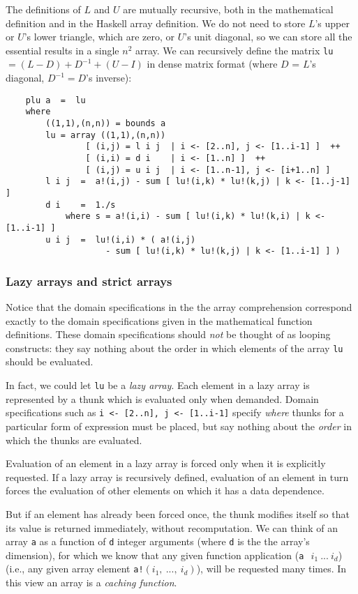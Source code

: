     The definitions of $L$ and $U$ are mutually recursive, both
in the mathematical definition and in the Haskell array definition.
We do not need to store $L$'s upper or $U$'s lower triangle, which
are zero, or $U$'s unit diagonal, so we can store all the essential
results in a single $n^2$ array.
We can recursively define the matrix {\tt lu}  $= (L-D) + D^{-1} + (U-I)$
in dense matrix format (where $D$ = $L$'s diagonal,
$D^{-1} = D$'s inverse):
\begin{verbatim}
    plu a  =  lu
    where
        ((1,1),(n,n)) = bounds a
        lu = array ((1,1),(n,n))
                [ (i,j) = l i j  | i <- [2..n], j <- [1..i-1] ]  ++
                [ (i,i) = d i    | i <- [1..n] ]  ++
                [ (i,j) = u i j  | i <- [1..n-1], j <- [i+1..n] ]
        l i j  =  a!(i,j) - sum [ lu!(i,k) * lu!(k,j) | k <- [1..j-1] ]
        d i    =  1./s
            where s = a!(i,i) - sum [ lu!(i,k) * lu!(k,i) | k <- [1..i-1] ]
        u i j  =  lu!(i,i) * ( a!(i,j)
                    - sum [ lu!(i,k) * lu!(k,j) | k <- [1..i-1] ] )
\end{verbatim}


\subsubsection {Lazy arrays and strict arrays}

Notice that the domain specifications in the the array comprehension
correspond exactly to the domain specifications given in the mathematical
function definitions.  These domain specifications should {\em not} be
thought of as looping constructs: they say nothing about the order in
which elements of the array {\tt lu} should be evaluated.

In fact, we could let {\tt lu} be a {\em lazy array}.   Each element
in a lazy array is represented by a thunk which is evaluated only when
demanded.  Domain specifications such as {\tt i <- [2..n], j <- [1..i-1]}
specify {\em where} thunks for a particular form of expression must be
placed, but say nothing about the {\em order} in which the thunks are
evaluated.

Evaluation of an element in a lazy array is forced only when it is
explicitly requested.  If a lazy array is recursively defined,
evaluation of an element in turn forces the evaluation of other
elements on which it has a data dependence.

But if an element has already been forced once, the thunk modifies
itself so that its value is returned immediately, without recomputation.
We can think of an array {\tt a} as a function of {\tt d} integer  
arguments
(where {\tt d} is the the array's dimension), for which we know that
any given function application ({\tt a }$\ i_1\ ...\ i_d$) (i.e.,
any given array element {\tt a!}$(i_1,\ ...,\ i_d)$), will be requested
many times.  In this view an array is a {\em caching function}.

